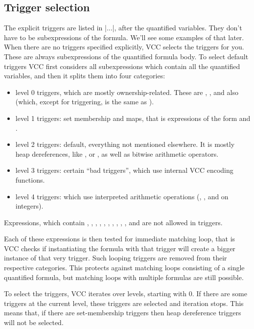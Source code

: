 \subsection{Trigger selection}
\label{sect:trigger-inference}

The explicit triggers are listed in \vcc|{...}|, after the quantified variables.
They don't have to be subexpressions of the formula. 
We'll see some examples of that later.
When there are no triggers specified explicitly, VCC selects the triggers for you.
These are always subexpressions of the quantified formula body.
To select default triggers VCC first considers all subexpressions which contain all the quantified variables,
and then it splits them into four categories:
\begin{itemize}
\item level 0 triggers, which are mostly ownership-related. 
These are , , and also  (which, except for triggering, is the same as ).
\item level 1 triggers: set membership and maps, that is expressions of 
the form  and .
\item level 2 triggers: default, \ie everything not mentioned elsewhere. 
It is mostly heap dereferences, like ,  or , as well as bitwise arithmetic operators.
\item level 3 triggers: certain ``bad triggers'', which use internal VCC encoding functions.
\item level 4 triggers: which use interpreted arithmetic operations (\vcc{+}, \vcc{-}, and \vcc{*} on integers).
\end{itemize}

Expressions, which contain \vcc{<=}, \vcc{>=}, \vcc{<}, \vcc{>}, \vcc{==},
\vcc{!=}, \vcc{||}, \vcc{&&}, \vcc{==>}, \vcc{<==>}, and \vcc{!} are not
allowed in triggers.

Each of these expressions is then tested for immediate matching loop,
that is VCC checks if instantiating the formula with that trigger
will create a bigger instance of that very trigger.
Such looping triggers are removed from their respective categories.
This protects against matching loops consisting of a single
quantified formula, but matching loops with multiple formulas
are still possible.

To select the triggers, VCC iterates over levels, starting with 0.
If there are some triggers at the current level, these triggers are selected
and iteration stops.
This means that, \eg if there are set-membership triggers then heap dereference
triggers will not be selected.

